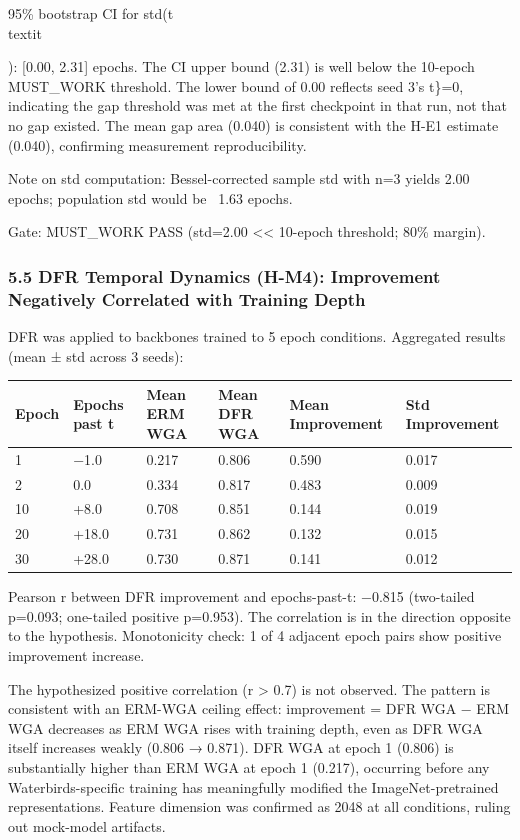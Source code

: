 95\% bootstrap CI for std(t\\textit{): [0.00, 2.31] epochs. The CI upper bound (2.31) is well below the 10-epoch MUST\_WORK threshold. The lower bound of 0.00 reflects seed 3's t\}=0, indicating the gap threshold was met at the first checkpoint in that run, not that no gap existed. The mean gap area (0.040) is consistent with the H-E1 estimate (0.040), confirming measurement reproducibility.

Note on std computation: Bessel-corrected sample std with n=3 yields 2.00 epochs; population std would be ~1.63 epochs.

Gate: MUST\_WORK PASS (std=2.00 << 10-epoch threshold; 80\% margin).

\subsubsection{5.5 DFR Temporal Dynamics (H-M4): Improvement Negatively Correlated with Training Depth}

DFR was applied to backbones trained to 5 epoch conditions. Aggregated results (mean ± std across 3 seeds):

\begin{table}[htbp]
\centering
\begin{tabular}{llllll}
\toprule
Epoch & Epochs past t\* & Mean ERM WGA & Mean DFR WGA & Mean Improvement & Std Improvement \\
\midrule
1 & −1.0 & 0.217 & 0.806 & 0.590 & 0.017 \\
2 & 0.0 & 0.334 & 0.817 & 0.483 & 0.009 \\
10 & +8.0 & 0.708 & 0.851 & 0.144 & 0.019 \\
20 & +18.0 & 0.731 & 0.862 & 0.132 & 0.015 \\
30 & +28.0 & 0.730 & 0.871 & 0.141 & 0.012 \\
\bottomrule
\end{tabular}
\end{table}

Pearson r between DFR improvement and epochs-past-t\*: −0.815 (two-tailed p=0.093; one-tailed positive p=0.953). The correlation is in the direction opposite to the hypothesis. Monotonicity check: 1 of 4 adjacent epoch pairs show positive improvement increase.

The hypothesized positive correlation (r > 0.7) is not observed. The pattern is consistent with an ERM-WGA ceiling effect: improvement = DFR WGA − ERM WGA decreases as ERM WGA rises with training depth, even as DFR WGA itself increases weakly (0.806 → 0.871). DFR WGA at epoch 1 (0.806) is substantially higher than ERM WGA at epoch 1 (0.217), occurring before any Waterbirds-specific training has meaningfully modified the ImageNet-pretrained representations. Feature dimension was confirmed as 2048 at all conditions, ruling out mock-model artifacts.

}

